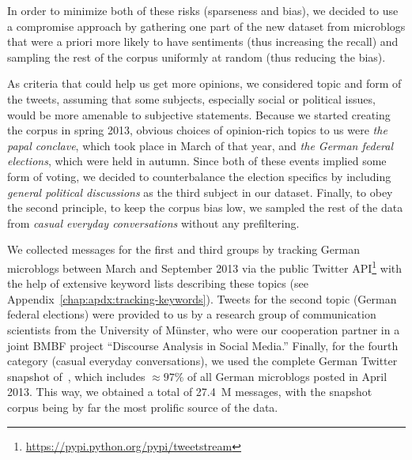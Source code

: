 In order to minimize both of these risks (sparseness and bias), we
decided to use a compromise approach by gathering one part of the new
dataset from microblogs that were a priori more likely to have
sentiments (thus increasing the recall) and sampling the rest of the
corpus uniformly at random (thus reducing the bias).

As criteria that could help us get more opinions, we considered topic
and form of the tweets, assuming that some subjects, especially social
or political issues, would be more amenable to subjective statements.
Because we started creating the corpus in spring 2013, obvious choices
of opinion-rich topics to us were \emph{the papal conclave}, which
took place in March of that year, and \emph{the German federal
  elections}, which were held in autumn.  Since both of these events
implied some form of voting, we decided to counterbalance the election
specifics by including \emph{general political discussions} as the
third subject in our dataset.  Finally, to obey the second principle,
\ie{} to keep the corpus bias low, we sampled the rest of the data
from \emph{casual everyday conversations} without any prefiltering.

We collected messages for the first and third groups by tracking
German microblogs between March and September 2013 via the public
Twitter API\footnote{\url{https://pypi.python.org/pypi/tweetstream}}
with the help of extensive keyword lists describing these topics (see
Appendix~\ref{chap:apdx:tracking-keywords}).  Tweets for the second
topic (German federal elections) were provided to us by a research
group of communication scientists from the University of M\"unster,
who were our cooperation partner in a joint BMBF project ``Discourse
Analysis in Social Media.''  Finally, for the fourth category (casual
everyday conversations), we used the complete German Twitter snapshot
of~\citet{Scheffler:14}, which includes $\approx97\%$ of all German
microblogs posted in April 2013.  This way, we obtained a total of
27.4~M messages, with the snapshot corpus being by far the most
prolific source of the data.


